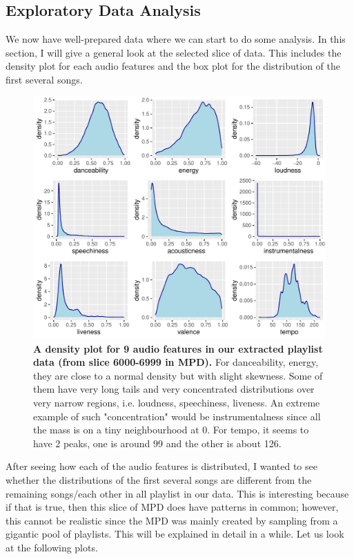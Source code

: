 \documentclass[12pt]{article}
\theoremstyle{plain}
\theoremstyle{definition}
\theoremstyle{remark}
\begin{document}
\newpage
\subsection{Exploratory Data Analysis}
We now have well-prepared data where we can start to do some analysis. In this section, I will give a general look at the selected slice of data. This includes the density plot for each audio features and the box plot for the distribution of the first several songs. 

\begin{figure}[htp]
    \centering
    \includegraphics[width=\textwidth]{Images/density.pdf}
    \caption{\textbf{A density plot for 9 audio features in our extracted playlist data (from slice 6000-6999 in MPD).} For danceability, energy, they are close to a normal density but with slight skewness. Some of them have very long tails and very concentrated distributions over very narrow regions, i.e. loudness, speechiness, liveness. An extreme example of such "concentration" would be instrumentalness since all the mass is on a tiny neighbourhood at 0. For tempo, it seems to have 2 peaks, one is around 99 and the other is about 126.}
    \label{fig:Density}
\end{figure}



After seeing how each of the audio features is distributed, I wanted to see whether the distributions of the first several songs are different from the remaining songs/each other in all playlist in our data. This is interesting because if that is true, then this slice of MPD does have patterns in common; however, this cannot be realistic since the MPD was mainly created by sampling from a gigantic pool of playlists. This will be explained in detail in a while. Let us look at the following plots.
\end{document}
